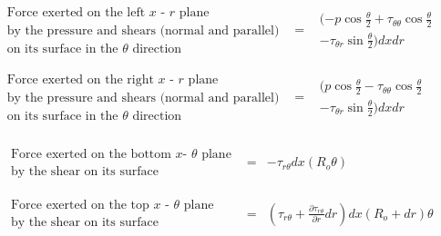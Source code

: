 \begin{displaymath}
	\begin{array}{ccc}
		\begin{array}{c}
		\textrm{Force exerted on the left $x$ - $r$ plane} \\
		\textrm{by the pressure and shears (normal and parallel)} \\
		\textrm{on its surface in the $\theta$ direction}
		\end{array} 
		& = &
		\begin{array}{c}
		(-p \cos{\frac{\theta}{2}} + \tau_{\theta \theta}\cos{\frac{\theta}{2}} \\
		-\tau_{\theta r}\sin{\frac{\theta}{2}}) dxdr
		\end{array} \\
	& \\ & \\
		\begin{array}{c}
		\textrm{Force exerted on the right $x$ - $r$ plane}\\
		\textrm{by the pressure and shears (normal and parallel)} \\
		\textrm{on its surface in the $\theta$ direction}
		\end{array} 
		& = &
		\begin{array}{c}
		(p \cos{\frac{\theta}{2}} - \tau_{\theta \theta}\cos{\frac{\theta}{2}} \\
		-\tau_{\theta r}\sin{\frac{\theta}{2}}) dxdr	
		\end{array}
	\end{array} 
\end{displaymath}
\\
\begin{displaymath}
	\begin{array}{ccc}
		\begin{array}{c}
		\textrm{Force exerted on the bottom $x$- $\theta$ plane} \\
		\textrm{by the shear on its surface}
		\end{array} & = &
		-\tau_{r\theta}dx (R_o \theta) \\
   	& \\ & \\
		\begin{array}{c}
		\textrm{Force exerted on the top $x$ - $\theta$ plane}\\
		\textrm{by the shear on its surface}
		\end{array} & = &
		(\tau_{r\theta} + \frac{\partial \tau_{r\theta}}{\partial r}dr) dx (R_o + dr) \theta
	\end{array}
\end{displaymath}

